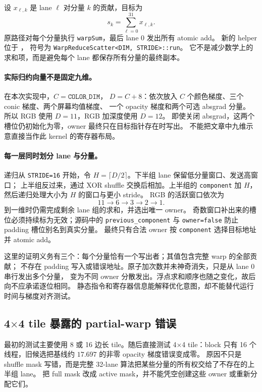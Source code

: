 设 \(x_{\ell,k}\) 是 lane \(\ell\) 对分量 \(k\) 的贡献，目标为
\[
 s_k=\sum_{\ell=0}^{31}x_{\ell,k}.
\]
原路径对每个分量执行 \texttt{warpSum}，最后 lane 0 发出所有 atomic add。
新的 helper 位于
，
符号为 \texttt{WarpReduceScatter<DIM, STRIDE>::run}。
它不是减少数学上的求和项，而是避免每个 lane 都保存所有分量的最终副本。

\paragraph{实际归约向量不是固定九维。}
在本次实现中，\(C=\texttt{COLOR\_DIM}\)，
\(D=C+8\)：依次放入 \(C\) 个颜色梯度、三个 conic 梯度、两个屏幕均值梯度、
一个 opacity 梯度和两个可选 absgrad 分量。
所以 RGB 使用 \(D=11\)，RGB 加深度使用 \(D=12\)。
即使关闭 absgrad，这两个槽位仍初始化为零，owner 最终只在目标指针存在时写出。
不能把文章中九维示意直接当作此 kernel 的寄存器布局。

\paragraph{每一层同时划分 lane 与分量。}
递归从 \texttt{STRIDE=16} 开始，令
\(H=\lceil D/2\rceil\)。下半组 lane 保留低分量窗口、发送高窗口；
上半组反过来，通过 XOR shuffle 交换后相加。上半组的
\texttt{component} 加 \(H\)，然后递归处理大小为 \(H\) 的窗口与更小 stride。
RGB 的活跃窗口依次为
\[
 11\longrightarrow6\longrightarrow3\longrightarrow2\longrightarrow1.
\]
到一维时仍需完成剩余 lane 组的求和，并选出唯一 owner。
奇数窗口补出来的槽位必须持续标为无效；源码中的
\texttt{previous\_component} 与 \texttt{owner=false} 防止 padding 槽位别名到真实分量。
最终只有合法 owner 按 \texttt{component} 选择目标地址并 atomic add。

这里的证明义务有三个：每个分量恰有一个写出者；其值包含完整 warp 的全部贡献；
不存在 padding 写入或错误地址。原子加次数并未神奇消失，只是从 lane 0 串行发出多个分量，
变为不同 owner 分散发出。浮点求和顺序也随之变化，故后向不应承诺逐位相同。
静态指令和寄存器信息能解释优化意图，却不能替代运行时间与梯度对齐测试。

\subsection{4\(\times\)4 tile 暴露的 partial-warp 错误}

最初的测试主要使用 8 或 16 边长 tile。随后直接测试
4\(\times\)4 tile：block 只有 16 个线程，旧候选把基线约
\(17.697\) 的非零 opacity 梯度错误变成零。
原因不只是 shuffle mask 写错，而是完整 32-lane 算法把某些分量的所有权交给了不存在的上半组 lane。
把 full mask 改成 active mask，并不能凭空创建这些 owner 或重新分配它们。

